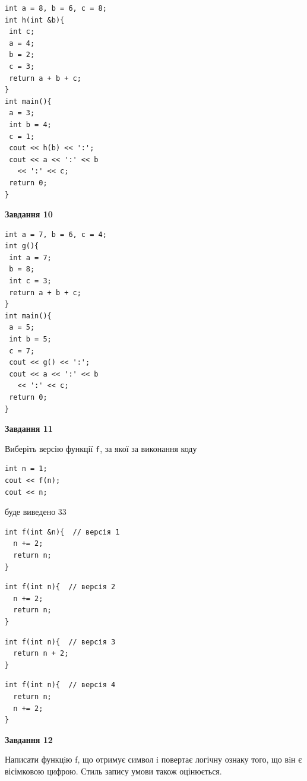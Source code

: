 \documentclass[12pt, ukrainian]{article}
\def\code#1{\Verb!#1!}
\begin{document}
{\begin {large}
\begin{minipage}[t]{7.0cm}
\begin{verbatim}
int a = 8, b = 6, c = 8;
int h(int &b){
 int c;
 a = 4;
 b = 2;
 c = 3;
 return a + b + c;
}
int main(){
 a = 3;
 int b = 4;
 c = 1;
 cout << h(b) << ':';
 cout << a << ':' << b 
   << ':' << c;
 return 0;
}
\end{verbatim}



\begin{center}
\textbf{Завдання 10}
\end{center}
\vspace{-8mm}

\begin{verbatim}
int a = 7, b = 6, c = 4;
int g(){
 int a = 7;
 b = 8;
 int c = 3;
 return a + b + c;
}
int main(){
 a = 5;
 int b = 5;
 c = 7;
 cout << g() << ':';
 cout << a << ':' << b 
   << ':' << c;
 return 0;
}
\end{verbatim}

\end{minipage}
\vline \hspace{1mm}
\begin{minipage}[t]{11.0cm}

\begin{center}
\textbf{Завдання 11}
\end{center}
Виберіть версію функції \code{f}, за якої за виконання коду
\begin{verbatim}
int n = 1;
cout << f(n);
cout << n;
\end{verbatim}

буде виведено 33

\begin{verbatim}
int f(int &n){  // версія 1
  n += 2;
  return n;
}
\end{verbatim}

\vspace{-8mm}\begin{verbatim}
int f(int n){  // версія 2
  n += 2;
  return n;
}
\end{verbatim}

\vspace{-8mm}\begin{verbatim}
int f(int n){  // версія 3
  return n + 2;
}
\end{verbatim}

\vspace{-8mm}\begin{verbatim}
int f(int n){  // версія 4
  return n;
  n += 2;
}
\end{verbatim}



\begin{center}
\textbf{Завдання 12}
\end{center}

Написати функцiю f, що отримує символ i повертає логічну ознаку того, що вiн є вісімковою цифрою. Стиль запису умови також оцінюється.\par

\end{minipage}

\end {large}}
\newpage
\end{document}
